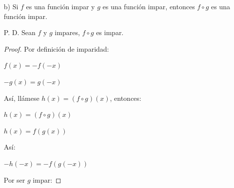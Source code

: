 \documentclass{article}
\begin{document}
\begin{enumerate}
\begin{enumerate}
\begin{enumerate}
\begin{proof}
            \(h(x) = (f \circ g)(x)\)
            
            \(h(x) = f(g(x))\)
            \vspace{\baselineskip}
            
            Y también:
            
            \(h(-x) = f(g(-x))\)
            \vspace{\baselineskip}
            
            Por ser \(g\) par:
            
            \(h(-x) = f(g(x))\)
            \vspace{\baselineskip}
            
            Por tanto, como \(h(x) = h(-x)\), \((f \circ g)(x) = (f \circ g)(-x)\), lo que hace que la composición sea par.
            \end{proof}
            
            \item[2.] Por ser tanto \(f\) como \(g\) pares, una vez demostramos \(f \circ g\) es par, se hace completamente análoga la demostración de \(g \circ f\).
        \end{enumerate}
        \vspace{\baselineskip}
        
        \item[b)] Si \(f\) es una función impar y \(g\) es una función impar, entonces \(f \circ g\) es una función impar.

        P. D. Sean \(f\) y \(g\) impares, \(f \circ g\) es impar.
        
        \begin{proof} Por definición de imparidad:
        
        \(f(x) = -f(-x)\)
        
        \(-g(x) = g(-x)\)
        \vspace{\baselineskip}
        
        Así, llámese \(h(x) = (f \circ g)(x)\), entonces:
        
        \(h(x) = (f \circ g)(x)\)
        
        \(h(x) = f(g(x))\)
        \vspace{\baselineskip}
        
        Así:
        
        \(-h(-x) = -f(g(-x))\)
        \vspace{\baselineskip}
        
        Por ser \(g\) impar:
        

\end{proof}
\end{enumerate}
\end{enumerate}
\end{document}

